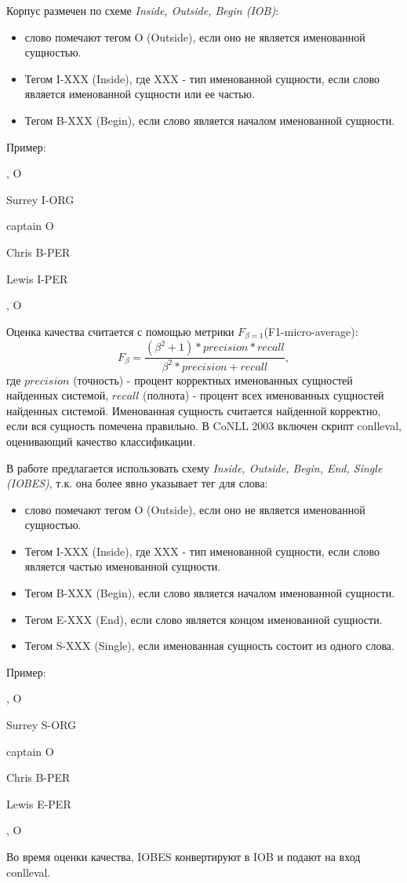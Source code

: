   Корпус размечен по схеме \textit{Inside, Outside, Begin (IOB)}:
  \begin{itemize}
  \item слово помечают тегом O (Outside), если оно не является именованной сущностью.
  \item Тегом I-XXX (Inside), где XXX - тип именованной сущности, если слово
    является именованной сущности или ее частью.
  \item Тегом B-XXX (Begin), если слово является началом именованной сущности.
  \end{itemize}

  Пример:
  \centerline{}
  \centerline{, O}
  \centerline{Surrey I-ORG}
  \centerline{captain O}
  \centerline{Chris B-PER}
  \centerline{Lewis I-PER}
  \centerline{, O}

  Оценка качества считается с помощью метрики $F_{\beta=1}$(F1-micro-average):
  \[
    F_\beta = \frac{(\beta^2 + 1) * precision * recall}{\beta^2*precision + recall},
  \]
  где $precision$ (точность) - процент корректных именованных сущностей
  найденных системой, $recall$ (полнота) - процент всех именованных сущностей
  найденных системой. Именованная сущность считается найденной корректно, если
  вся сущность помечена правильно.
  В CoNLL 2003 включен скрипт conlleval, оценивающий качество классификации.

  В работе \citep{collobert2011natural} предлагается использовать схему
  \textit{Inside, Outside, Begin, End, Single (IOBES)}, т.к. она более явно указывает
  тег для слова:
  \begin{itemize}
  \item слово помечают тегом O (Outside), если оно не является именованной сущностью.
  \item Тегом I-XXX (Inside), где XXX - тип именованной сущности, если слово является частью именованной сущности.
  \item Тегом B-XXX (Begin), если слово является началом именованной сущности.
  \item Тегом E-XXX (End), если слово является концом именованной сущности.
  \item Тегом S-XXX (Single), если именованная сущность состоит из одного слова.
  \end{itemize}

  Пример:
  \centerline{}
  \centerline{, O}
  \centerline{Surrey S-ORG}
  \centerline{captain O}
  \centerline{Chris B-PER}
  \centerline{Lewis E-PER}
  \centerline{, O}

  Во время оценки качества, IOBES конвертируют в IOB и подают на вход conlleval.

